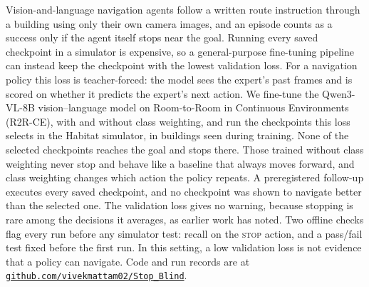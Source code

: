 Vision-and-language navigation agents follow a written route instruction through a building using
only their own camera images, and an episode counts as a success only if the agent itself stops
near the goal. Running every saved checkpoint in a simulator is expensive, so a general-purpose
fine-tuning pipeline can instead keep the checkpoint with the lowest validation loss. For a
navigation policy this loss is teacher-forced: the model sees the expert's past frames and is scored
on whether it predicts the expert's next action. We fine-tune the Qwen3-VL-8B vision--language model
on Room-to-Room in Continuous Environments (R2R-CE), with and without class weighting, and run the
checkpoints this loss selects in the Habitat simulator, in buildings seen during training. None of
the selected checkpoints reaches the goal and stops there. Those trained without class weighting
never stop and behave like a baseline that always moves forward, and class weighting changes which
action the policy repeats. A preregistered follow-up executes every saved checkpoint, and no
checkpoint was shown to navigate better than the selected one. The validation loss gives no warning,
because stopping is rare among the decisions it averages, as earlier work has noted. Two offline
checks flag every run before any simulator test: recall on the \textsc{stop} action, and a pass/fail
test fixed before the first run. In this setting, a low validation loss is not evidence that a
policy can navigate. Code and run records are at
\href{https://github.com/vivekmattam02/Stop_Blind}{\texttt{github.com/vivekmattam02/Stop\_Blind}}.
